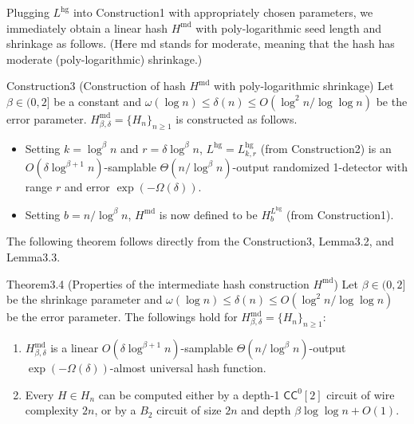 Plugging $L^{\mathrm{hg}}$ into Construction1 with appropriately chosen parameters, we immediately obtain a linear hash $H^{\mathrm{md}}$ with poly-logarithmic seed length and shrinkage as follows. (Here md stands for moderate, meaning that the hash has moderate (poly-logarithmic) shrinkage.)
\begin{authorclaim}{Construction3 (Construction of hash $H^{\mathrm{md}}$ with poly-logarithmic shrinkage)}
Let $\beta\in(0,2]$ be a constant and $\omega(\log n)\le\delta(n)\le O(\log^2n/\log\log n)$ be the error parameter. $H^{\mathrm{md}}_{\beta,\delta}=\{H_n\}_{n\ge1}$ is constructed as follows.
\begin{itemize}
\item Setting $k=\log^\beta n$ and $r=\delta\log^\beta n$, $L^{\mathrm{hg}}=L^{\mathrm{hg}}_{k,r}$ (from Construction2) is an $O(\delta\log^{\beta+1}n)$-samplable $\Theta(n/\log^\beta n)$-output randomized 1-detector with range $r$ and error $\exp(-\Omega(\delta))$.
\item Setting $b=n/\log^\beta n$, $H^{\mathrm{md}}$ is now defined to be $H_b^{L^{\mathrm{hg}}}$ (from Construction1).
\end{itemize}
\end{authorclaim}
The following theorem follows directly from the Construction3, Lemma3.2, and Lemma3.3.
\begin{authorclaim}{Theorem3.4 (Properties of the intermediate hash construction $H^{\mathrm{md}}$)}
Let $\beta\in(0,2]$ be the shrinkage parameter and $\omega(\log n)\le\delta(n)\le O(\log^2n/\log\log n)$ be the error parameter. The followings hold for $H^{\mathrm{md}}_{\beta,\delta}=\{H_n\}_{n\ge1}$:
\begin{enumerate}
\item $H^{\mathrm{md}}_{\beta,\delta}$ is a linear $O(\delta\log^{\beta+1}n)$-samplable $\Theta(n/\log^\beta n)$-output $\exp(-\Omega(\delta))$-almost universal hash function.
\item Every $H\in H_n$ can be computed either by a depth-1 $\mathsf{CC}^0[2]$ circuit of wire complexity $2n$, or by a $B_2$ circuit of size $2n$ and depth $\beta\log\log n+O(1)$.
\end{enumerate}
\end{authorclaim}


